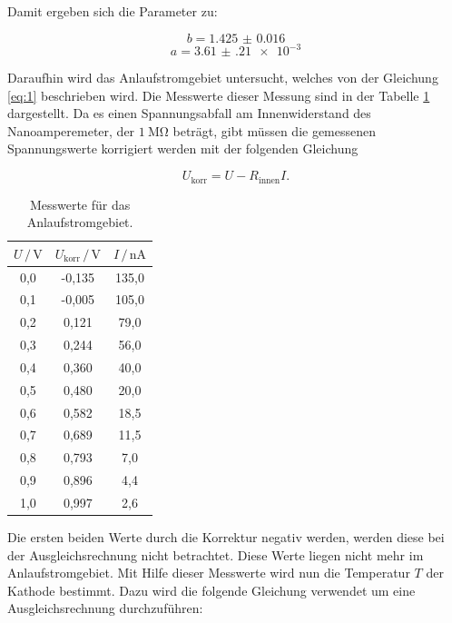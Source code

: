 Damit ergeben sich die Parameter zu:

\begin{equation*}
  b = \num{1.425(16)}
\end{equation*}
\begin{equation*}
  a = \num{3.61(21)e-3}
\end{equation*}


Daraufhin wird das Anlaufstromgebiet untersucht, welches von der Gleichung \ref{eq:1} beschrieben wird.
Die Messwerte dieser Messung sind
in der Tabelle \ref{tab:3} dargestellt. Da es einen Spannungsabfall am Innenwiderstand des
Nanoamperemeter, der $\SI{1}{\mega\ohm}$ beträgt, gibt müssen die gemessenen Spannungswerte
korrigiert werden mit der folgenden Gleichung

\begin{equation*}
  U_\text{korr} = U - R_\text{innen} I.
\end{equation*}

\begin{table}[H]
  \centering
  \caption{Messwerte für das Anlaufstromgebiet.}
  \label{tab:3}
  \begin{tabular}{c c c}
    \toprule
    $ U \, / \, \si{\volt}$ & $U_\text{korr} \, / \, \si{\volt}$ & $ I \, / \, \si{\nano\ampere}$ \\
    \midrule
    0,0 & -0,135 & 135,0 \\
    0,1 & -0,005 & 105,0 \\
    0,2 &  0,121 &  79,0 \\
    0,3 &  0,244 &  56,0 \\
    0,4 &  0,360 &  40,0 \\
    0,5 &  0,480 &  20,0 \\
    0,6 &  0,582 &  18,5 \\
    0,7 &  0,689 &  11,5 \\
    0,8 &  0,793 &   7,0 \\
    0,9 &  0,896 &   4,4 \\
    1,0 &  0,997 &   2,6 \\
    \bottomrule
  \end{tabular}
\end{table}

Die ersten beiden Werte durch die Korrektur negativ werden, werden diese bei der
Ausgleichsrechnung nicht betrachtet. Diese Werte liegen nicht mehr im Anlaufstromgebiet.
Mit Hilfe dieser Messwerte wird nun die Temperatur $T$ der Kathode bestimmt.
Dazu wird die folgende Gleichung verwendet um eine Ausgleichsrechnung durchzuführen:

